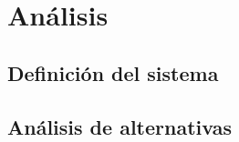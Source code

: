 \chapter{Análisis}\label{chap:analisis}
\section{Definición del sistema}\label{sec:definicion}

\section{Análisis de alternativas}\label{sec:alternativas}
